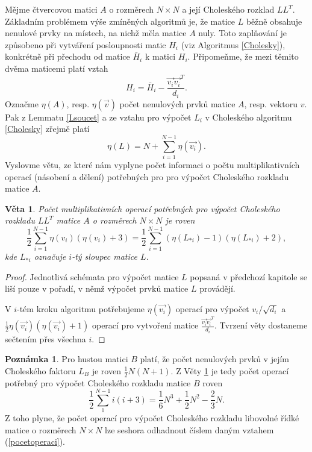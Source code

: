 \documentclass{ctuthesis}
\theoremstyle{plain}
\newtheorem{theorem}{Věta}
\theoremstyle{definition}
\newtheorem{remark}{Poznámka}
\begin{document}
Mějme čtvercovou matici $A$ o rozměrech $N\times N$ a její Choleského rozklad $LL^T$. Základním problémem výše zmíněných algoritmů je, že matice $L$ běžně obsahuje nenulové prvky na místech, na nichž měla matice $A$ nuly. Toto zaplňování je způsobeno při vytváření posloupnosti matic $H_i$ (viz Algoritmus \ref{Cholesky}), konkrétně při přechodu od matice $\bar{H}_i$ k matici $H_i$. Připomeňme, že mezi těmito dvěma maticemi platí vztah
\[
H_i = \bar{H}_i - \frac{\vec{v_i}\vec{v_i}^T}{d_i}.
\]
Označme $\eta(A)$, resp. $\eta(\vec{v})$ počet nenulových prvků matice $A$, resp. vektoru $v$. Pak z Lemmatu \ref{Lsoucet} a ze vztahu pro výpočet $L_i$ v Choleského algoritmu \ref{Cholesky} zřejmě platí
\[
\eta(L) = N + \sum_{i=1}^{N-1}\eta(\vec{v_i}).
\]
Vyslovme větu, ze které nám vyplyne počet informaci o počtu multiplikativních operací (násobení a dělení) potřebných pro pro výpočet Choleského rozkladu matice $A$.
\begin{theorem}
\label{Cholesky_operace}
  Počet multiplikativních operací potřebných pro výpočet Choleského rozkladu $LL^T$ matice $A$ o rozměrech $N \times N$ je roven
  \[
  \frac12\sum_{i=1}^{N-1}\eta(v_i)\left(\eta(v_i)+3\right)=
  \frac12\sum_{i=1}^{N-1}\left(\eta(L_{*i})-1\right)\left(\eta(L_{*i})+2\right),
  \]
  kde $L_{*i}$ označuje $i$-tý sloupec matice $L$.
\end{theorem}
\begin{proof}
  Jednotlivá schémata pro výpočet matice $L$ popsaná v předchozí kapitole se liší pouze v pořadí, v němž výpočet prvků matice $L$ provádějí.

  V $i$-tém kroku algoritmu potřebujeme $\eta(\vec{v_i})$ operací pro výpočet $v_i/\sqrt{d_i}$ a $\frac12\eta(\vec{v_i})\left(\eta(\vec{v_i})+1\right)$ operací pro vytvoření matice $\frac{\vec{v_i}\vec{v_i}^T}{d_i}$. Tvrzení věty dostaneme sečtením přes všechna $i$.
\end{proof}

\begin{remark}
Pro hustou matici $B$ platí, že počet nenulových prvků v jejím Choleského faktoru $L_B$ je roven $\frac12 N(N+1)$.
Z Věty \ref{Cholesky_operace} je tedy počet operací potřebný pro výpočet Choleského rozkladu matice $B$ roven
\begin{equation}\label{pocetoperaci}
  \frac12 \sum_{1}^{N-1}i(i+3) = \frac16 N^3 + \frac12 N^2 - \frac23 N.
\end{equation}
Z toho plyne, že počet operací pro výpočet Choleského rozkladu libovolné řídké matice o rozměrech $N \times N $ lze seshora odhadnout číslem daným vztahem (\ref{pocetoperaci}).
\end{remark}
\end{document}
